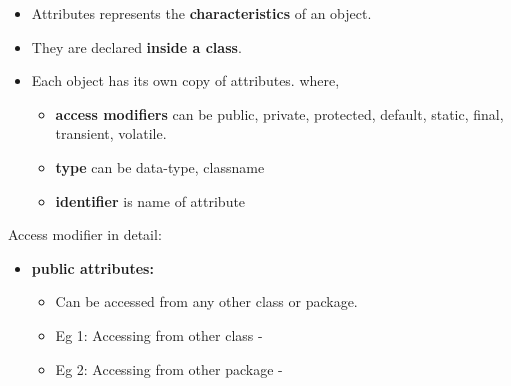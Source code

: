\setlength{\columnsep}{3pt}
\begin{flushleft}

	\begin{itemize}
		\item Attributes represents the \textbf{characteristics} of an object.
		\item They are declared \textbf{inside a class}.
		\item Each object has its own copy of attributes.
		\bigskip
		where,
		\begin{itemize}
			\item \textbf{access modifiers} can be public, private, protected, default, static, final, transient, volatile.
			\item \textbf{type} can be data-type, classname
			\item \textbf{identifier} is name of attribute
		\end{itemize}
		
	\end{itemize}	
	
	Access modifier in detail:
	\begin{itemize}
		\item \textbf{public attributes:}
		\begin{itemize}
			\item Can be accessed from any other class or package.
			\item Eg 1: Accessing from other class -
			\bigskip

			\newpage
			\item Eg 2: Accessing from other package -
			\bigskip
			

\end{itemize}
\end{itemize}
\end{flushleft}
